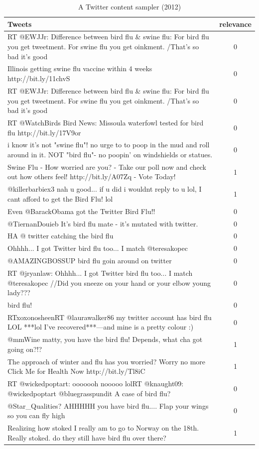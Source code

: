 \documentclass[12pt, oneside]{article}
\begin{document}
\begin{table}[h!]
\centering
\begin{adjustbox}{max width=\textwidth}
 \begin{tabular}{| l | c |} 
 \hline
 \textbf{Tweets} & \textbf{relevance} \\ [0.5ex]
 \hline
 \hline
 RT @EWJJr: Difference between bird flu \& swine flu: For bird flu you get tweetment. For swine flu you get oinkment. /That's so bad it's good & 0 \\
 Illinois getting swine flu vaccine within 4 weeks http://bit.ly/11chvS & 0\\
 RT @EWJJr: Difference between bird flu \& swine flu: For bird flu you get tweetment. For swine flu you get oinkment. /That's so bad it's good & 0 \\
 RT @WatchBirds Bird News: Missoula waterfowl tested for bird flu http://bit.ly/17V9or  & 0 \\
 i know it's not "swine flu"! no urge to to poop in the mud and roll around in it. NOT "bird flu"- no poopin' on windshields or statues. & 0\\
 Swine Flu - How worried are you? - Take our poll now and check out how others feel! http://bit.ly/A07Zq - Vote Today! & 1\\
 @killerbarbiex3 nah u good... if u did i wouldnt reply to u lol, I cant afford to get the Bird Flu! lol & 1\\
 Even @BarackObama got the Twitter Bird Flu!! & 0\\
 @TiernanDouieb It's bird flu mate - it's mutated with twitter.& 0 \\
 HA @ twitter catching the bird flu & 0\\
 Ohhhh... I got Twitter bird flu too... I match @teresakopec & 0\\
 @AMAZINGBOSSUP bird flu goin around on twitter & 0\\
 RT @jryanlaw: Ohhhh... I got Twitter bird flu too... I match @teresakopec //Did you sneeze on your hand or your elbow young lady??? & 0 \\
 bird flu! & 0 \\
 RTxoxonosheenRT @laurawalker86 my twitter account has bird flu LOL ***lol I've recovered***---and mine is a pretty colour :) & 0\\
 @mmWine matty, you have the bird flu! Depends, what cha got going on?!? & 1 \\
 The approach of winter and flu has you worried? Worry no more Click Me for Health Now http://bit.ly/Tl8iC & 1\\
 RT @wickedpoptart: ooooooh nooooo lolRT @knaught09: @wickedpoptart @bluegrasspundit A case of bird flu? & 0\\
 @Star\_Qualities? AHHHHH you have bird flu.... Flap your wings so you can fly high & 0\\
 Realizing how stoked I really am to go to Norway on the 18th. Really stoked. do they still have bird flu over there? & 1\\
 \hline
 \end{tabular}
 \end{adjustbox}
 \caption{A Twitter content sampler (2012)}
\label{table:sampler}
\end{table}
\end{document}
